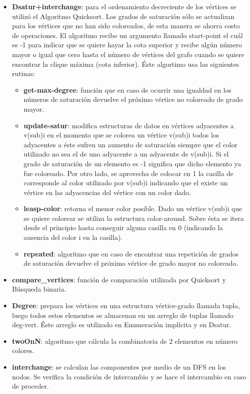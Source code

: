 \documentclass[a4paper,10pt]{article}
\begin{document}
\begin{itemize}
 \item \textbf{Dsatur+interchange}: para el ordenamiento decreciente de
       los vértices se utilizó el Algoritmo Quicksort. Los grados de
       saturación sólo se actualizan para los vértices que no han sido
       coloreados, de esta manera se ahorra costo de operaciones. El
       algoritmo recibe un argumento llamado start-point el cuál es -1
       para indicar que se quiere hayar la cota superior y recibe algún
       número mayor o igual que cero hasta el número de vértices del
       grafo cuando se quiere encontrar la clique máxima (cota
       inferior). \'Este algortimo usa las siguientes rutinas:
\begin{itemize}
 \item \textbf{get-max-degree}: función que en caso de ocurrir una
       igualdad en los números de saturación devuelve el próximo vértice
       no coloreado de grado mayor.
 \item \textbf{update-satur}: modifica estructuras de datos en vértices
       adyacentes a v(sub)i en el momento que se colorea un vértice
       v(sub)i todos los adyacentes a éste sufren un aumento de
       saturación siempre que el color utilizado no sea el de uno
       adyacente a un adyacente de v(sub)i. Si el grado de saturación de
       un elemento es -1 significa que dicho elemento ya fue
       coloreado. Por otro lado, se aprovecha de colocar en 1 la casilla
       de corresponde al color utilizado por v(sub)i indicando que el
       existe un vértice en las adyacencias del vértice con un color
       dado.
 \item \textbf{leasp-color}: retorna el menor color posible. Dado un
       vértice v(sub)i que se quiere colorear se utiliza la estructura
       color-around. Sobre ésta se itera desde el principio hasta
       conseguir alguna casilla en 0 (indicando la ausencia del color i
       en la casilla).
 \item \textbf{repeated}: algoritmo que en caso de encontrar una
       repetición de grados de saturación devuelve el próximo vértice de
       grado mayor no coloreado.
\end{itemize}
 \item \textbf{compare_vertices}: función de comparación utilizada por
       Quicksort y B\'usqueda binaria.
 \item \textbf{Degree}: prepara los vértices en una estructura
       vértice-grado llamada tupla, luego todos estos elementos se
       almacenan en un arreglo de tuplas llamado deg-vert. \'Este
       arreglo es utilizado en Enumeraci\'on impl\'icita y en Dsatur.
 \item \textbf{twoOnN}: algoritmo que cálcula la combinatoria de 2
       elementos en número colores.
 \item \textbf{interchange}: se calculan las componentes por medio de un
       DFS en los nodos. Se verifica la condición de intercambio y se
       hace el intercambio en caso de proceder.
\end{itemize}
\end{document}
